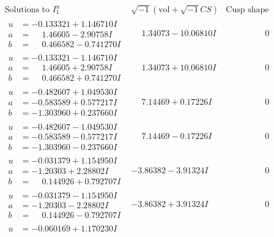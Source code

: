 \documentclass[1p]{elsarticle_modified}
\theoremstyle{definition}
\newcommand{\I}{\sqrt{-1}}
\begin{document}
$$\begin{array}{c|c|c}
\text{Solutions to }I^u_{1}& \I (\text{vol} + \sqrt{-1}CS) & \text{Cusp shape}\\
 \hline 
\begin{aligned}
u &= -0.133321 + 1.146710 I \\
a &= \phantom{-}1.46605 - 2.90758 I \\
b &= \phantom{-}0.466582 - 0.741270 I\end{aligned}
 & \phantom{-}1.34073 - 10.06810 I & \phantom{-0.000000 } 0 \\ \hline\begin{aligned}
u &= -0.133321 - 1.146710 I \\
a &= \phantom{-}1.46605 + 2.90758 I \\
b &= \phantom{-}0.466582 + 0.741270 I\end{aligned}
 & \phantom{-}1.34073 + 10.06810 I & \phantom{-0.000000 } 0 \\ \hline\begin{aligned}
u &= -0.482607 + 1.049530 I \\
a &= -0.583589 + 0.577217 I \\
b &= -1.303960 + 0.237660 I\end{aligned}
 & \phantom{-}7.14469 + 0.17226 I & \phantom{-0.000000 } 0 \\ \hline\begin{aligned}
u &= -0.482607 - 1.049530 I \\
a &= -0.583589 - 0.577217 I \\
b &= -1.303960 - 0.237660 I\end{aligned}
 & \phantom{-}7.14469 - 0.17226 I & \phantom{-0.000000 } 0 \\ \hline\begin{aligned}
u &= -0.031379 + 1.154950 I \\
a &= -1.20303 + 2.28802 I \\
b &= \phantom{-}0.144926 + 0.792707 I\end{aligned}
 & -3.86382 - 3.91324 I & \phantom{-0.000000 } 0 \\ \hline\begin{aligned}
u &= -0.031379 - 1.154950 I \\
a &= -1.20303 - 2.28802 I \\
b &= \phantom{-}0.144926 - 0.792707 I\end{aligned}
 & -3.86382 + 3.91324 I & \phantom{-0.000000 } 0 \\ \hline\begin{aligned}
u &= -0.060169 + 1.170230 I \\

\end{aligned}
\end{array}$$
\end{document}
